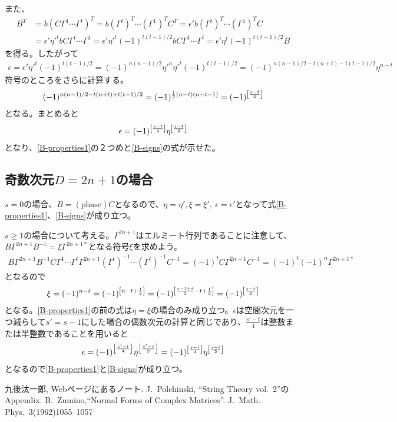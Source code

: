 \documentclass[12pt,a4paper,dvipdfmx]{jlreq}
\begin{document}
また、
\begin{align*}
  B^T&=b( C \Gamma^{1} \cdots \Gamma^{t})^T
  =b (\Gamma^{t})^T \cdots (\Gamma^{1})^T C^T
  =\epsilon' b (\Gamma^{t})^T \cdots (\Gamma^{1})^T C\\
  &=\epsilon' \eta'^{t} b C \Gamma^{t} \cdots \Gamma^{1}
  =\epsilon' \eta'^{t} (-1)^{t(t-1)/2}b C \Gamma^{1} \cdots \Gamma^{t}=\epsilon' \eta^{t} (-1)^{t(t-1)/2} B
\end{align*}
を得る。したがって
\begin{align*}
  \epsilon=\epsilon' \eta'^{t} (-1)^{t(t-1)/2}
  =(-1)^{n(n-1)/2} \eta'^n \eta'^{t} (-1)^{t(t-1)/2}
  =(-1)^{n(n-1)/2-t(n+t)-t(t-1)/2} \eta^{n-t}
\end{align*}
符号のところをさらに計算する。
\begin{align*}
  (-1)^{n(n-1)/2-t(n+t)+t(t-1)/2}=(-1)^{\frac12 (n-t)(n-t-1)}
  =(-1)^{\qty[\frac{s-t}{4}]}
\end{align*}
となる。まとめると
\begin{align*}
  \epsilon=(-1)^{\qty[\frac{s-t}{4}]}\eta^{\qty[\frac{s-t}{2}]}
\end{align*}
となり、\eqref{B-properties1}の２つめと\eqref{B-signs}の式が示せた。

\subsection{奇数次元$D=2n+1$の場合}
$s=0$の場合、$B=(\text{phase}) C$となるので、$\eta=\eta', \xi=\xi',\ \epsilon=\epsilon'$となって式\eqref{B-properties1}、\eqref{B-signs}が成り立つ。

$s\ge 1$の場合について考える。$\Gamma^{2n+1}$はエルミート行列であることに注意して、$B \Gamma^{2n+1} B^{-1}=\xi \Gamma^{2n+1 *}$となる符号$\xi$を求めよう。
\begin{align*}
  B \Gamma^{2n+1} B^{-1}
  C \Gamma^{1} \cdots \Gamma^{t} \Gamma^{2n+1}
  (\Gamma^{t})^{-1} \cdots (\Gamma^{t})^{-1}C^{-1}
  =(-1)^{t} C \Gamma^{2n+1} C^{-1}
  =(-1)^{t}(-1)^{n} \Gamma^{2n+1 *}
\end{align*}
となるので
\begin{align*}
  \xi=(-1)^{n-t}
  =(-1)^{\qty[n-t+\frac12]}
  =(-1)^{\qty[\frac{s-1+t}{2}-t+\frac12]}
  =(-1)^{\qty[\frac{s-t}{2}]}
\end{align*}
となる。\eqref{B-properties1}の前の式は$\eta=\xi$の場合のみ成り立つ。$\epsilon$は空間次元を一つ減らして$s'=s-1$にした場合の偶数次元の計算と同じであり、$\frac{s'-t}{4}$は整数または半整数であることを用いると
\begin{align*}
  \epsilon
  =(-1)^{\qty[\frac{s'-t}{4}]}\eta^{\qty[\frac{s'-t}{2}]}  
  =(-1)^{\qty[\frac{s-t}{4}]}\eta^{\qty[\frac{s-t}{2}]}
\end{align*}
となるので\eqref{B-properties1}と\eqref{B-signs}が成り立つ。

\begin{thebibliography}{9}
   九後汰一郎, Webページにあるノート.
   J.~Polchinski, ``String Theory vol.~2''のAppendix.
   B.~Zumino,``Normal Forms of Complex Matrices''. J.~Math.~ Phys.\ 3(1962)1055–1057
\end{thebibliography}
\end{document}
